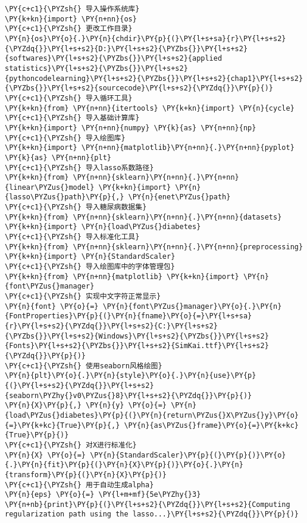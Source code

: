 \begin{Verbatim}[commandchars=\\\{\}]
\PY{c+c1}{\PYZsh{} 导入操作系统库}
\PY{k+kn}{import} \PY{n+nn}{os}
\PY{c+c1}{\PYZsh{} 更改工作目录}
\PY{n}{os}\PY{o}{.}\PY{n}{chdir}\PY{p}{(}\PY{l+s+sa}{r}\PY{l+s+s2}{\PYZdq{}}\PY{l+s+s2}{D:}\PY{l+s+s2}{\PYZbs{}}\PY{l+s+s2}{softwares}\PY{l+s+s2}{\PYZbs{}}\PY{l+s+s2}{applied statistics}\PY{l+s+s2}{\PYZbs{}}\PY{l+s+s2}{pythoncodelearning}\PY{l+s+s2}{\PYZbs{}}\PY{l+s+s2}{chap1}\PY{l+s+s2}{\PYZbs{}}\PY{l+s+s2}{sourcecode}\PY{l+s+s2}{\PYZdq{}}\PY{p}{)}
\PY{c+c1}{\PYZsh{} 导入循环工具}
\PY{k+kn}{from} \PY{n+nn}{itertools} \PY{k+kn}{import} \PY{n}{cycle}
\PY{c+c1}{\PYZsh{} 导入基础计算库}
\PY{k+kn}{import} \PY{n+nn}{numpy} \PY{k}{as} \PY{n+nn}{np}
\PY{c+c1}{\PYZsh{} 导入绘图库}
\PY{k+kn}{import} \PY{n+nn}{matplotlib}\PY{n+nn}{.}\PY{n+nn}{pyplot} \PY{k}{as} \PY{n+nn}{plt}
\PY{c+c1}{\PYZsh{} 导入lasso系数路径}
\PY{k+kn}{from} \PY{n+nn}{sklearn}\PY{n+nn}{.}\PY{n+nn}{linear\PYZus{}model} \PY{k+kn}{import} \PY{n}{lasso\PYZus{}path}\PY{p}{,} \PY{n}{enet\PYZus{}path}
\PY{c+c1}{\PYZsh{} 导入糖尿病数据集}
\PY{k+kn}{from} \PY{n+nn}{sklearn}\PY{n+nn}{.}\PY{n+nn}{datasets} \PY{k+kn}{import} \PY{n}{load\PYZus{}diabetes}
\PY{c+c1}{\PYZsh{} 导入标准化工具}
\PY{k+kn}{from} \PY{n+nn}{sklearn}\PY{n+nn}{.}\PY{n+nn}{preprocessing} \PY{k+kn}{import} \PY{n}{StandardScaler}
\PY{c+c1}{\PYZsh{} 导入绘图库中的字体管理包}
\PY{k+kn}{from} \PY{n+nn}{matplotlib} \PY{k+kn}{import} \PY{n}{font\PYZus{}manager}
\PY{c+c1}{\PYZsh{} 实现中文字符正常显示}
\PY{n}{font} \PY{o}{=} \PY{n}{font\PYZus{}manager}\PY{o}{.}\PY{n}{FontProperties}\PY{p}{(}\PY{n}{fname}\PY{o}{=}\PY{l+s+sa}{r}\PY{l+s+s2}{\PYZdq{}}\PY{l+s+s2}{C:}\PY{l+s+s2}{\PYZbs{}}\PY{l+s+s2}{Windows}\PY{l+s+s2}{\PYZbs{}}\PY{l+s+s2}{Fonts}\PY{l+s+s2}{\PYZbs{}}\PY{l+s+s2}{SimKai.ttf}\PY{l+s+s2}{\PYZdq{}}\PY{p}{)}
\PY{c+c1}{\PYZsh{} 使用seaborn风格绘图}
\PY{n}{plt}\PY{o}{.}\PY{n}{style}\PY{o}{.}\PY{n}{use}\PY{p}{(}\PY{l+s+s2}{\PYZdq{}}\PY{l+s+s2}{seaborn\PYZhy{}v0\PYZus{}8}\PY{l+s+s2}{\PYZdq{}}\PY{p}{)}
\PY{n}{X}\PY{p}{,} \PY{n}{y} \PY{o}{=} \PY{n}{load\PYZus{}diabetes}\PY{p}{(}\PY{n}{return\PYZus{}X\PYZus{}y}\PY{o}{=}\PY{k+kc}{True}\PY{p}{,} \PY{n}{as\PYZus{}frame}\PY{o}{=}\PY{k+kc}{True}\PY{p}{)}
\PY{c+c1}{\PYZsh{} 对X进行标准化}
\PY{n}{X} \PY{o}{=} \PY{n}{StandardScaler}\PY{p}{(}\PY{p}{)}\PY{o}{.}\PY{n}{fit}\PY{p}{(}\PY{n}{X}\PY{p}{)}\PY{o}{.}\PY{n}{transform}\PY{p}{(}\PY{n}{X}\PY{p}{)}
\PY{c+c1}{\PYZsh{} 用于自动生成alpha}
\PY{n}{eps} \PY{o}{=} \PY{l+m+mf}{5e\PYZhy{}3}
\PY{n+nb}{print}\PY{p}{(}\PY{l+s+s2}{\PYZdq{}}\PY{l+s+s2}{Computing regularization path using the lasso...}\PY{l+s+s2}{\PYZdq{}}\PY{p}{)}

\end{Verbatim}
